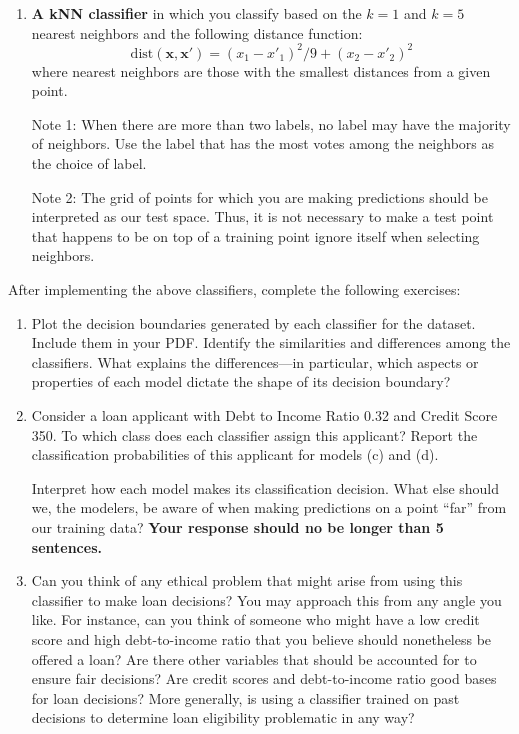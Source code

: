 \documentclass[submit]{../harvardml}
\begin{document}
\begin{problem}
\begin{enumerate}[label=\alph*)]
  \item \textbf{A kNN classifier} in which you classify based on the $k = 1$ and $k = 5$ nearest neighbors and the following distance function: 
  \[\text{dist}(\boldsymbol{x}, \boldsymbol{x}') = (x_1 - x'_1)^2/9 + (x_2 - x'_2)^2\]
        where nearest neighbors are those with the smallest distances from a given point.

        Note 1: When there are more than two labels, no label may have the
        majority of neighbors.  Use the label that has the most votes among
        the neighbors as the choice of label.

        Note 2: The grid of points for which you are making predictions
        should be interpreted as our test space.  Thus, it is not necessary
        to make a test point that happens to be on top of a training point
        ignore itself when selecting neighbors.

\end{enumerate}

After implementing the above classifiers, complete the following exercises:
  \begin{enumerate}



      \item Plot the decision boundaries generated by each classifier for the dataset. Include them in your PDF.
            Identify the similarities and differences among the classifiers. What explains the differences---in particular, which aspects or properties of each model dictate the shape of its decision boundary?
    
      \item
    
            Consider a loan applicant with Debt to Income Ratio 0.32 and Credit Score 350. To which class does each classifier assign this applicant? Report the classification probabilities of this applicant for models (c) and (d).
            
            Interpret how each model makes its classification decision. What else should we, the modelers, be aware of when making predictions on a point “far” from our training data? \textbf{Your response should no be longer than 5 sentences.}

    \item
        Can you think of any ethical problem that might arise from using this classifier to make loan decisions? You may approach this from any angle you like. For instance, can you think of someone who might have a low credit score and high debt-to-income ratio that you believe should nonetheless be offered a loan? Are there other variables that should be accounted for to ensure fair decisions? Are credit scores and debt-to-income ratio good bases for loan decisions? More generally, is using a classifier trained on past decisions to determine loan eligibility problematic in any way?
    \end{enumerate}
\end{problem}
\end{document}
